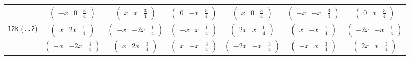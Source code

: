 \documentclass[fleqn,9pt,landscape]{jsarticle}
\begin{document}
\begin{center}
\begin{longtable}{ccccccc}
& $ \begin{pmatrix} - x & 0 & \frac{3}{4} \end{pmatrix} $ & $ \begin{pmatrix} x & x & \frac{3}{4} \end{pmatrix} $ & $ \begin{pmatrix} 0 & - x & \frac{3}{4} \end{pmatrix} $ & $ \begin{pmatrix} x & 0 & \frac{3}{4} \end{pmatrix} $ & $ \begin{pmatrix} - x & - x & \frac{3}{4} \end{pmatrix} $ & $ \begin{pmatrix} 0 & x & \frac{3}{4} \end{pmatrix} $ \\ \hline
{\tt 12k} ({\tt ..2}) & $ \begin{pmatrix} x & 2 x & \frac{1}{4} \end{pmatrix} $ & $ \begin{pmatrix} - x & - 2 x & \frac{1}{4} \end{pmatrix} $ & $ \begin{pmatrix} - x & x & \frac{1}{4} \end{pmatrix} $ & $ \begin{pmatrix} 2 x & x & \frac{1}{4} \end{pmatrix} $ & $ \begin{pmatrix} x & - x & \frac{1}{4} \end{pmatrix} $ & $ \begin{pmatrix} - 2 x & - x & \frac{1}{4} \end{pmatrix} $ \\
& $ \begin{pmatrix} - x & - 2 x & \frac{3}{4} \end{pmatrix} $ & $ \begin{pmatrix} x & 2 x & \frac{3}{4} \end{pmatrix} $ & $ \begin{pmatrix} x & - x & \frac{3}{4} \end{pmatrix} $ & $ \begin{pmatrix} - 2 x & - x & \frac{3}{4} \end{pmatrix} $ & $ \begin{pmatrix} - x & x & \frac{3}{4} \end{pmatrix} $ & $ \begin{pmatrix} 2 x & x & \frac{3}{4} \end{pmatrix} $ \\ \hline

\end{longtable}
\end{center}
\end{document}
